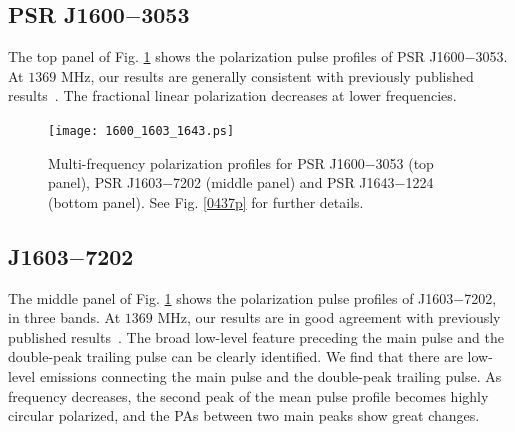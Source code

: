 \documentclass[useAMS,usenatbib]{mn2e}
\begin{document}
\subsection{PSR J1600$-$3053}

The top panel of Fig. \ref{1600p} shows the polarization pulse profiles of 
PSR J1600$-$3053.
%
At $1369$ MHz, our results are generally consistent with previously published
results~\citep{Ord04,Yan11}.
%
The fractional linear polarization decreases at lower frequencies.

%
%
%
%


\begin{figure}
\begin{center}
\texttt{[image: 1600\_1603\_1643.ps]}
\caption{Multi-frequency polarization profiles for PSR J1600$-$3053 (top 
panel), PSR J1603$-$7202 (middle panel) and PSR J1643$-$1224 (bottom panel). 
See Fig. \ref{0437p} for further details.}
\label{1600p}
\end{center}
\end{figure}

\subsection{J1603$-$7202}

The middle panel of Fig. \ref{1600p} shows the polarization pulse profiles of 
J1603$-$7202, in three bands.
%
At $1369$ MHz, our results are in good agreement with previously published
results~\citep{Ord04,Yan11}.
%
The broad low-level feature preceding the main pulse and the double-peak trailing 
pulse can be clearly identified.
%
We find that there are low-level emissions connecting the main pulse and the 
double-peak trailing pulse.
%
As frequency decreases, the second peak of the mean pulse profile becomes highly 
circular polarized, and the PAs between two main peaks show great changes.
\end{document}
